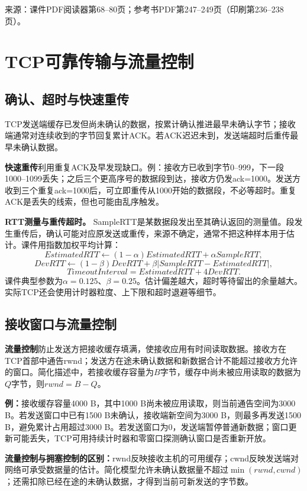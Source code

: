 \annotationarea[4]
\small 来源：课件PDF阅读器第68--80页；参考书PDF第247--249页（印刷第236--238页）。\normalsize

\section{TCP可靠传输与流量控制}
\subsection{确认、超时与快速重传}
TCP发送端缓存已发但尚未确认的数据，按累计确认推进最早未确认字节；接收端通常对连续收到的字节回复累计ACK。若ACK迟迟未到，发送端超时后重传最早未确认数据。

\textbf{快速重传}利用重复ACK及早发现缺口。例：接收方已收到字节0--999，下一段1000--1099丢失；之后三个更高序号的数据段到达，接收方仍发ack=1000。发送方收到三个重复ack=1000后，可立即重传从1000开始的数据段，不必等超时。重复ACK是丢失的线索，但也可能由乱序触发。

\textbf{RTT测量与重传超时。} SampleRTT是某数据段发出至其确认返回的测量值。段发生重传后，确认可能对应原发送或重传，来源不确定，通常不把这种样本用于估计。课件用指数加权平均计算：
\[
EstimatedRTT\leftarrow(1-\alpha)EstimatedRTT+\alpha SampleRTT,
\]
\[
DevRTT\leftarrow(1-\beta)DevRTT+\beta|SampleRTT-EstimatedRTT|,
\]
\[
TimeoutInterval=EstimatedRTT+4DevRTT.
\]
课件典型参数为$\alpha=0.125$、$\beta=0.25$。估计偏差越大，超时等待留出的余量越大。实际TCP还会使用计时器粒度、上下限和超时退避等细节。

\annotationarea[4]

\subsection{接收窗口与流量控制}
\textbf{流量控制}防止发送方把接收缓存填满，使接收应用有时间读取数据。接收方在TCP首部中通告rwnd；发送方在途未确认数据和新数据合计不能超过接收方允许的窗口。简化描述中，若接收缓存容量为$B$字节，缓存中尚未被应用读取的数据为$Q$字节，则$rwnd=B-Q$。

\textbf{例：}接收缓存容量4000 B，其中1000 B尚未被应用读取，则当前通告空间为3000 B。若发送窗口中已有1500 B未确认，接收端新空间为3000 B，则最多再发送1500 B，避免累计占用超过3000 B。若发送窗口为0，发送端暂停普通新数据；窗口更新可能丢失，TCP可用持续计时器和零窗口探测确认窗口是否重新开放。

\textbf{流量控制与拥塞控制的区别：}rwnd反映接收主机的可用缓存；cwnd反映发送端对网络可承受数据量的估计。简化模型允许未确认数据量不超过$\min(rwnd,cwnd)$；还需扣除已经在途的未确认数据，才得到当前可新发送的字节数。

